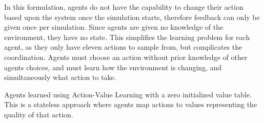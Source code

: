 \documentclass[letterpaper]{article}
\begin{document}
In this formulation, agents do not have the capability to change their action based upon the system once the simulation starts, therefore feedback can only be given once per simulation. Since agents are given no knowledge of the environment, they have no state. This simplifies the learning problem for each agent, as they only have eleven actions to sample from, but complicates the coordination. Agents must choose an action without prior knowledge of other agents choices, and must learn how the environment is changing, and simultaneously what action to take.

Agents learned using Action-Value Learning with a zero initialized value table. This is a stateless approach where agents map actions to values representing the quality of that action. 




\end{document}
